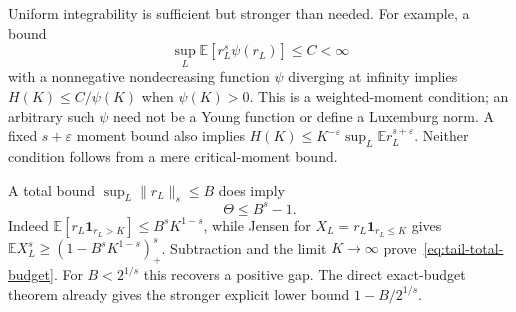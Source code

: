 \documentclass[11pt]{article}
\begin{document}
Uniform integrability is sufficient but stronger than needed. For example,
a bound
\[
 \sup_L\mathbb E[r_L^s\psi(r_L)]\le C<\infty
\]
with a
nonnegative nondecreasing function $\psi$ diverging at infinity implies
$H(K)\le C/\psi(K)$ when $\psi(K)>0$. This is a weighted-moment
condition; an arbitrary such $\psi$ need not be a Young function or
define a Luxemburg norm. A fixed $s+\varepsilon$ moment bound also
implies $H(K)\le K^{-\varepsilon}\sup_L\mathbb E r_L^{s+\varepsilon}$.
Neither condition follows from a mere critical-moment bound.

A total bound $\sup_L\|r_L\|_s\le B$ does imply
\begin{equation}\label{eq:tail-total-budget}
 \Theta\le B^s-1.
\end{equation}
Indeed $\mathbb E[r_L\mathbf1_{r_L>K}]\le B^sK^{1-s}$, while Jensen
for $X_L=r_L\mathbf1_{r_L\le K}$ gives
$\mathbb E X_L^s\ge(1-B^sK^{1-s})_+^s$. Subtraction and the limit
$K\to\infty$ prove~\eqref{eq:tail-total-budget}. For $B<2^{1/s}$ this
recovers a positive gap. The direct exact-budget theorem already gives
the stronger explicit lower bound $1-B/2^{1/s}$.
\end{document}
